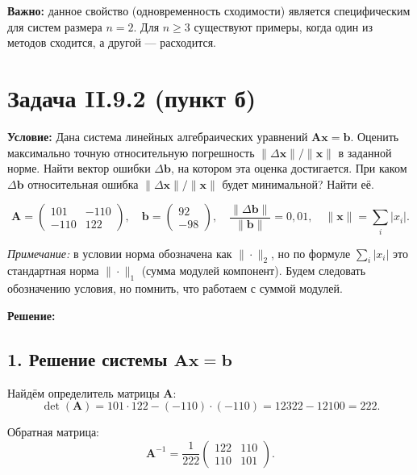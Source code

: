 \documentclass{article}
\begin{document}
\textbf{Важно:} данное свойство (одновременность сходимости) является специфическим для систем размера $n = 2$. Для $n \geqslant 3$ существуют примеры, когда один из методов сходится, а другой --- расходится.



\section*{Задача II.9.2 (пункт б)}

\textbf{Условие:} Дана система линейных алгебраических уравнений $\mathbf{A}\mathbf{x} = \mathbf{b}$. Оценить максимально точную относительную погрешность $\|\Delta\mathbf{x}\|/\|\mathbf{x}\|$ в заданной норме. Найти вектор ошибки $\Delta\mathbf{b}$, на котором эта оценка достигается. При каком $\Delta\mathbf{b}$ относительная ошибка $\|\Delta\mathbf{x}\|/\|\mathbf{x}\|$ будет минимальной? Найти её.

$$\mathbf{A} = \begin{pmatrix} 101 & -110 \\ -110 & 122 \end{pmatrix}, \quad \mathbf{b} = \begin{pmatrix} 92 \\ -98 \end{pmatrix}, \quad \frac{\|\Delta\mathbf{b}\|}{\|\mathbf{b}\|} = 0{,}01, \quad \|\mathbf{x}\| = \sum_i |x_i|.$$

\textit{Примечание:} в условии норма обозначена как $\|\cdot\|_2$, но по формуле $\sum_i |x_i|$ это стандартная норма $\|\cdot\|_1$ (сумма модулей компонент). Будем следовать обозначению условия, но помнить, что работаем с суммой модулей.

\vspace{0.5cm}
\textbf{Решение:}

\subsection*{1. Решение системы $\mathbf{A}\mathbf{x} = \mathbf{b}$}

Найдём определитель матрицы $\mathbf{A}$:
\begin{equation}
\det(\mathbf{A}) = 101 \cdot 122 - (-110) \cdot (-110) = 12322 - 12100 = 222.
\end{equation}

Обратная матрица:
\begin{equation}
\mathbf{A}^{-1} = \frac{1}{222} \begin{pmatrix} 122 & 110 \\ 110 & 101 \end{pmatrix}.
\end{equation}
\end{document}
